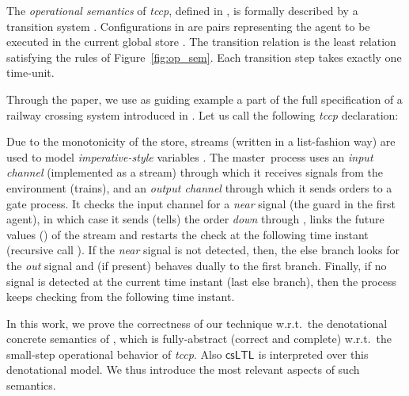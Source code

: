 \documentclass[american]{new_tlp}
\newcommand*{\controller}{master}
\newcommand*{\csltl}[1][]{\ensuremath{\textsf{csLTL}_{#1}}}
\newcommand*{\tccp}{\textit{tccp}}
\providecommand*{\wrt}  {w.r.t.}
\begin{document}
The \emph{operational semantics} of \tccp{}, defined in \cite{deBoerGM99},
is formally described by a transition system .
Configurations in  are pairs  representing the agent
 to be executed in the current global store .  The transition
relation  is the least relation
satisfying the rules of Figure~\ref{fig:op_sem}.  Each transition step takes
exactly one time-unit.
\begin{example}\label{ex:gateController}
    Through the paper, we use as guiding example a part of the full
    specification of a railway crossing system introduced in
    \cite{AlpuenteGPV06}.  Let us call  the following \tccp{}
    declaration: {\small
    
    }Due to the monotonicity of the store, streams (written in a
    list-fashion way) are used to model \emph{imperative-style} variables
    \cite{deBoerGM99}.  The \controller\ process uses an \emph{input
    channel}  (implemented as a stream) through which it receives
    signals from the environment (trains), and an \emph{output channel} 
    through which it sends orders to a gate process.  It checks the input
    channel for a \textit{near} signal (the guard in the first
     agent), in which case it sends (tells) the order
    \textit{down} through , links the future values () of the stream
     and restarts the check at the following time instant (recursive
    call ).  If the \emph{near} signal is not
    detected, then, the else branch looks for the \emph{out} signal and (if
    present) behaves dually to the first branch.  Finally, if no signal is
    detected at the current time instant (last else branch), then the
    process keeps checking from the following time instant.
\end{example}

In this work, we prove the correctness of our technique \wrt\ the
denotational concrete semantics of \cite{CominiTV13semTR}, which is
fully-abstract (correct and complete) \wrt\ the small-step operational
behavior of \tccp{}.  Also \csltl{} is interpreted over this
denotational model.  We thus introduce the most relevant aspects of
such semantics.
\end{document}

